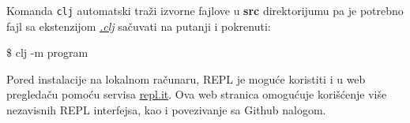 Komanda \texttt{clj} automatski traži izvorne fajlove u \textbf{src} direktorijumu pa je potrebno fajl sa ekstenzijom \underline{\textit{.clj}} sačuvati na putanji  i pokrenuti:

\begin{tcolorbox}[colback=green!5!white,colframe=green!5!white,fontupper=\ttfamily]
\$ clj -m program
\end{tcolorbox}
 

Pored instalacije na lokalnom računaru, REPL je moguće koristiti i u web pregledaču pomoću servisa \href{https://repl.it/languages/clojure}{repl.it}. Ova web stranica omogućuje korišćenje više nezavisnih REPL interfejsa, kao i povezivanje sa Github nalogom.